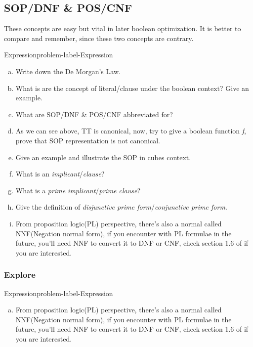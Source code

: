 \documentclass[main.tex]{subfiles}
\begin{document}
\subsection{SOP/DNF \& POS/CNF}
These concepts are easy but vital in later boolean optimization. It is better to compare and remember, since these two concepts are contrary.
\begin{problem}{Expression}{problem-label-Expression}
\begin{enumerate}[(a)]
    \item Write down the De Morgan’s Law.
    \item What is are the concept of literal/clause under the boolean context? Give an example.
    \item What are SOP/DNF \& POS/CNF abbreviated for?
    \item As we can see above, TT is canonical, now, try to give a boolean function \textit{f}, prove that SOP representation is not canonical.
    \item Give an example and illustrate the SOP in cubes context.
    \item What is an \textit{implicant}/\textit{clause}?
    \item What is a \textit{prime implicant}/\textit{prime clause}?
    \item Give the definition of \textit{disjunctive prime form}/\textit{conjunctive prime form}.
    \item From proposition logic(PL) perspective, there's also a normal called NNF(Negation normal form), if you encounter with PL formulae in the future, you'll need NNF to convert it to DNF or CNF, check section 1.6 of \cite{CalculusOfComputation} if you are interested. 
\end{enumerate}
\end{problem}
\vspace*{4\baselineskip}

\subsubsection{Explore}
\begin{problem}{Expression}{problem-label-Expression}
\begin{enumerate}[(a)]
    \item From proposition logic(PL) perspective, there's also a normal called NNF(Negation normal form), if you encounter with PL formulae in the future, you'll need NNF to convert it to DNF or CNF, check section 1.6 of \cite{CalculusOfComputation} if you are interested. 
\end{enumerate}
\end{problem}
\end{document}

